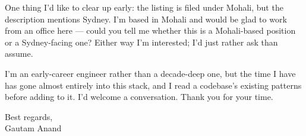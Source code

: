 \documentclass[letterpaper,11pt]{article}
\begin{document}
One thing I'd like to clear up early: the listing is filed under Mohali, but the description mentions Sydney. I'm based in Mohali and would be glad to work from an office here --- could you tell me whether this is a Mohali-based position or a Sydney-facing one? Either way I'm interested; I'd just rather ask than assume.

I'm an early-career engineer rather than a decade-deep one, but the time I have has gone almost entirely into this stack, and I read a codebase's existing patterns before adding to it. I'd welcome a conversation. Thank you for your time.

\vspace{6pt}

Best regards, \\
Gautam Anand
\end{document}
